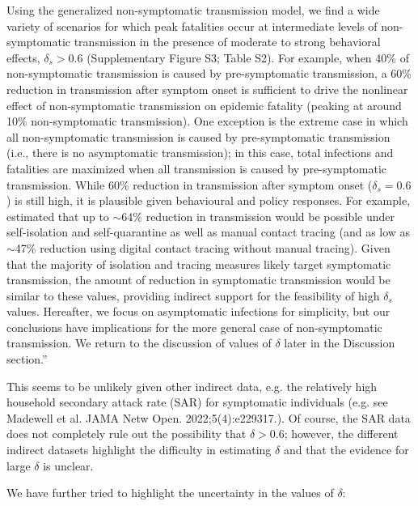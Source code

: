\documentclass[12pt]{article}
\newcommand{\revtext}{\textsf}
\begin{document}
Using the generalized non-symptomatic transmission model, we find a wide variety of scenarios for which peak fatalities occur at intermediate levels of non-symptomatic transmission in the presence of moderate to strong behavioral effects, $\delta_s > 0.6$ (Supplementary Figure S3; Table S2).
For example, when 40\% of non-symptomatic transmission is caused by pre-symptomatic transmission, a 60\% reduction in transmission after symptom onset is sufficient to drive the nonlinear effect of non-symptomatic transmission on epidemic fatality (peaking at around 10\% non-symptomatic transmission).
One exception is the extreme case in which all non-symptomatic transmission is caused by pre-symptomatic transmission (i.e., there is no asymptomatic transmission);
in this case, total infections and fatalities are maximized when all transmission is caused by pre-symptomatic transmission. 
While 60\% reduction in transmission after symptom onset ($\delta_s = 0.6$) is still high, it is plausible given behavioural and policy responses.
For example, \cite{kucharski2020effectiveness} estimated that up to $\sim$64\% reduction in transmission would be possible under self-isolation and self-quarantine as well as manual contact tracing (and as low as $\sim$47\% reduction using digital contact tracing without manual tracing).
Given that the majority of isolation and tracing measures likely target symptomatic transmission, the amount of reduction in symptomatic transmission would be similar to these values, providing indirect support for the feasibility of high $\delta_s$ values. 
Hereafter, we focus on asymptomatic infections for simplicity, but our conclusions have implications for the more general case of non-symptomatic transmission.
We return to the discussion of values of $\delta$ later in the Discussion section.''

\revtext{This seems to be unlikely given other indirect data, e.g. the relatively high household secondary attack rate (SAR) for symptomatic individuals (e.g. see Madewell et al. JAMA Netw Open. 2022;5(4):e229317.). Of course, the SAR data does not completely rule out the possibility that $\delta>0.6$; however, the different indirect datasets highlight the difficulty in estimating $\delta$ and that the evidence for large $\delta$ is unclear.}

We have further tried to highlight the uncertainty in the values of $\delta$:
\end{document}
